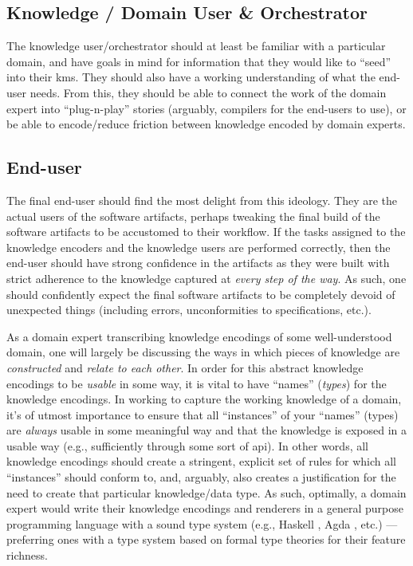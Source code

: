 \subsection{Knowledge / Domain User \& Orchestrator}

The knowledge user/orchestrator should at least be familiar with a particular
domain, and have goals in mind for information that they would like to ``seed''
into their \acl{kms}. They should also have a working understanding of what the
end-user needs. From this, they should be able to connect the work of the domain
expert into ``plug-n-play'' stories (arguably, compilers for the end-users to
use), or be able to encode/reduce friction between knowledge encoded by domain
experts.

\subsection{End-user}

The final end-user should find the most delight from this ideology. They are the
actual users of the software artifacts, perhaps tweaking the final build of the
software artifacts to be accustomed to their workflow. If the tasks assigned to
the knowledge encoders and the knowledge users are performed correctly, then the
end-user should have strong confidence in the artifacts as they were built with
strict adherence to the knowledge captured at \textit{every step of the way}. As
such, one should confidently expect the final software artifacts to be
completely devoid of unexpected things (including errors, unconformities to
specifications, etc.).

As a domain expert transcribing knowledge encodings of some well-understood
domain, one will largely be discussing the ways in which pieces of knowledge are
\textit{constructed} and \textit{relate to each other}. In order for this
abstract knowledge encodings to be \textit{usable} in some way, it is vital to
have ``names'' (\textit{types}) for the knowledge encodings. In working to
capture the working knowledge of a domain, it's of utmost importance to ensure
that all ``instances'' of your ``names'' (types) are \textit{always} usable in
some meaningful way and that the knowledge is exposed in a usable way (e.g.,
sufficiently through some sort of \acs{api}). In other words, all knowledge
encodings should create a stringent, explicit set of rules for which all
``instances'' should conform to, and, arguably, also creates a justification for
the need to create that particular knowledge/data type. As such, optimally, a
domain expert would write their knowledge encodings and renderers in a general
purpose programming language with a sound type system (e.g., Haskell
\cite{Haskell2010}, Agda \cite{Norell2007}, etc.) — preferring ones with a type
system based on formal type theories for their feature richness.

